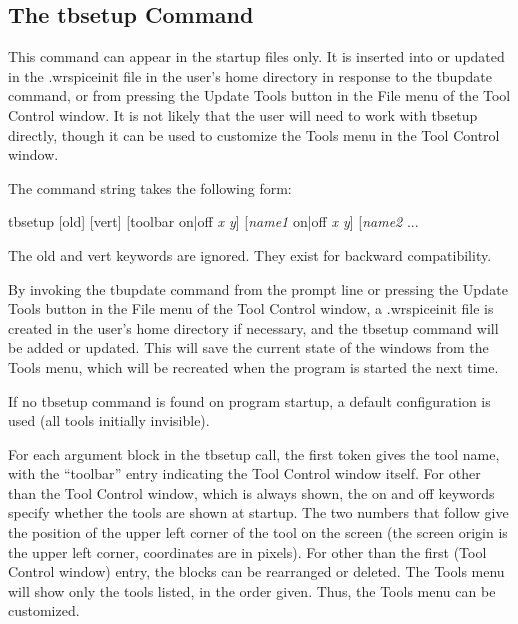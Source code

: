 \subsection{The {\vt tbsetup} Command}



This command can appear in the startup files only.  It is inserted
into or updated in the {\vt .wrspiceinit} file in the user's home
directory in response to the {\cb tbupdate} command, or from pressing
the {\cb Update Tools} button in the {\cb File} menu of the {\cb Tool
Control window}.  It is not likely that the user will need to work
with {\cb tbsetup} directly, though it can be used to customize the
{\cb Tools} menu in the {\cb Tool Control} window.

The command string takes the following form:
\begin{lquote}{\vt
tbsetup [old] [vert] [toolbar on|off {\it x y}] [{\it name1} on|off {\it x y}]
 [{\it name2} ...}
\end{lquote}
The {\vt old} and {\vt vert} keywords are ignored.  They exist for
backward compatibility.

By invoking the {\cb tbupdate} command from the prompt line or
pressing the {\cb Update Tools} button in the {\cb File} menu of the
{\cb Tool Control} window, a {\vt .wrspiceinit} file is created in the
user's home directory if necessary, and the {\cb tbsetup} command will
be added or updated.  This will save the current state of the windows
from the {\cb Tools} menu, which will be recreated when the program is
started the next time.

If no {\cb tbsetup} command is found on program startup, a
default configuration is used (all tools initially invisible).

For each argument block in the {\cb tbsetup} call, the first token
gives the tool name, with the ``{\vt toolbar}'' entry indicating the
{\cb Tool Control} window itself.  For other than the {\cb Tool
Control} window, which is always shown, the {\vt on} and {\vt off}
keywords specify whether the tools are shown at startup.  The two
numbers that follow give the position of the upper left corner of the
tool on the screen (the screen origin is the upper left corner,
coordinates are in pixels).  For other than the first ({\cb Tool
Control} window) entry, the blocks can be rearranged or deleted.  The
{\cb Tools} menu will show only the tools listed, in the order given. 
Thus, the {\cb Tools} menu can be customized.

